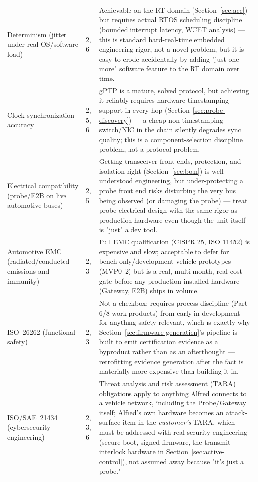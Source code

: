 \begin{center}
\begin{longtable}{@{}p{2.4cm} p{1.7cm} p{11.2cm}@{}}
Determinism (jitter under real OS/software load) & 2, 6 & Achievable on the RT domain (Section~\ref{sec:acc}) but requires actual RTOS scheduling discipline (bounded interrupt latency, WCET analysis) --- this is standard hard-real-time embedded engineering rigor, not a novel problem, but it is easy to erode accidentally by adding "just one more" software feature to the RT domain over time. \\
Clock synchronization accuracy & 2, 5, 6 & gPTP is a mature, solved protocol, but achieving it reliably requires hardware timestamping support in every hop (Section~\ref{sec:probe-discovery}) --- a cheap non-timestamping switch/NIC in the chain silently degrades sync quality; this is a component-selection discipline problem, not a protocol problem. \\
Electrical compatibility (probe/E2B on live automotive buses) & 2, 5 & Getting transceiver front ends, protection, and isolation right (Section~\ref{sec:bom}) is well-understood engineering, but under-protecting a probe front end risks disturbing the very bus being observed (or damaging the probe) --- treat probe electrical design with the same rigor as production hardware even though the unit itself is "just" a dev tool. \\
Automotive EMC (radiated/conducted emissions and immunity) & 2, 3 & Full EMC qualification (CISPR 25, ISO 11452) is expensive and slow; acceptable to defer for bench-only/development-vehicle prototypes (MVP0--2) but is a real, multi-month, real-cost gate before any production-installed hardware (Gateway, E2B) ships in volume. \\
ISO~26262 (functional safety) & 2, 3 & Not a checkbox; requires process discipline (Part 6/8 work products) from early in development for anything safety-relevant, which is exactly why Section~\ref{sec:firmware-generation}'s pipeline is built to emit certification evidence as a byproduct rather than as an afterthought --- retrofitting evidence generation after the fact is materially more expensive than building it in. \\
ISO/SAE~21434 (cybersecurity engineering) & 2, 3, 6 & Threat analysis and risk assessment (TARA) obligations apply to anything Alfred connects to a vehicle network, including the Probe/Gateway itself; Alfred's own hardware becomes an attack-surface item in the \emph{customer's} TARA, which must be addressed with real security engineering (secure boot, signed firmware, the transmit-interlock hardware in Section~\ref{sec:active-control}), not assumed away because "it's just a probe." \\

\end{longtable}
\end{center}
